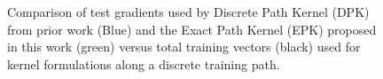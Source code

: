 \begin{frame}
\begin{figure}[!ht]
\begin{tikzpicture}[scale=1.2]
    

\end{tikzpicture}
\caption{Comparison of test gradients used by Discrete Path Kernel (DPK) from prior work (Blue) and the Exact Path Kernel (EPK) proposed in this work (green) versus total training vectors (black) used for kernel formulations along a discrete training path. }
\label{fig:vecs}
\end{figure}
\end{frame}

